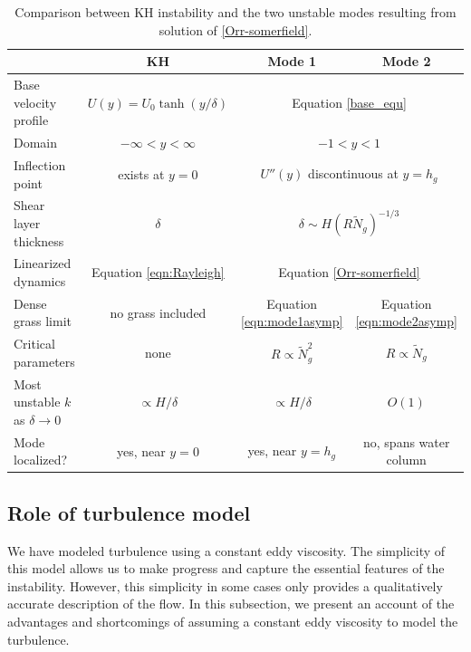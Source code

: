 \documentclass{jfm}
\newcommand{\hg}{h_g}
\renewcommand{\Rey}{{R}}
\newcommand{\Ndg}{\tilde{N}_g}
\begin{document}
\begin{table}
{}  %
\renewcommand{\arraystretch}{1.2}
 \begin{tabular}{l|c|c|c}
			& KH 				& Mode 1 		& Mode 2 \\ \hline
 Base velocity profile 	& $U(y) = U_0 \tanh(y/\delta)$			& \multicolumn{2}{c}{Equation \eqref{base_equ}} \\
 Domain 		& $-\infty < y < \infty$			& \multicolumn{2}{c}{$-1<y<1$} \\
 Inflection point	& exists at $y=0$				& \multicolumn{2}{c}{$U''(y)$ discontinuous at $y=\hg$} \\
 Shear layer thickness	& $\delta$					& \multicolumn{2}{c}{$\delta \sim  H\left(\Rey \Ndg \right)^{-1/3}$} \\
 Linearized dynamics	& Equation \eqref{eqn:Rayleigh}		& \multicolumn{2}{c}{Equation \eqref{Orr-somerfield}} \\
 Dense grass limit &  no grass included & Equation \eqref{eqn:mode1asymp} & Equation \eqref{eqn:mode2asymp}  \\
 Critical parameters	& none						& $\Rey \propto \Ndg^{2}$ 	& $\Rey \propto \Ndg$ \\
 Most unstable $k$ as $\delta \to 0$	& $\propto H/\delta$		& $\propto H/\delta$	& $O(1)$ \\
 Mode localized?	& yes, near $y=0$				& yes, near $y=\hg$			& no, spans water column
 \end{tabular}
 \caption{Comparison between KH instability and the two unstable modes resulting from solution of \ref{Orr-somerfield}.}
 \label{tab:comparison}
\end{table}
\subsection{Role of turbulence model}\label{subsec:turbulencemodel}
We have modeled turbulence using a constant eddy viscosity. 
The simplicity of this model allows us to make progress and capture the essential features of the instability. 
However, this simplicity in some cases only provides a qualitatively accurate description of the flow. 
In this subsection, we present an account of the advantages and shortcomings of assuming a constant eddy viscosity to model the turbulence.
\end{document}
